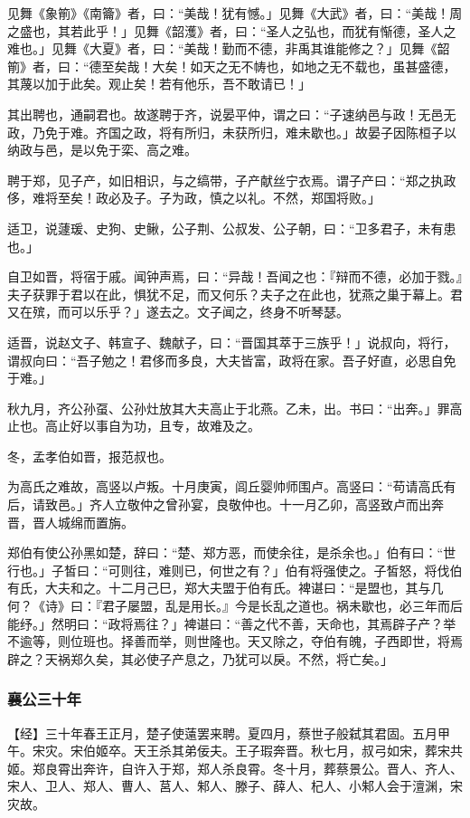 \documentclass[]{article}
\begin{document}
见舞《象箾》《南籥》者，曰：``美哉！犹有憾。」见舞《大武》者，曰：``美哉！周之盛也，其若此乎！」见舞《韶濩》者，曰：``圣人之弘也，而犹有惭德，圣人之难也。」见舞《大夏》者，曰：``美哉！勤而不德，非禹其谁能修之？」见舞《韶箾》者，曰：``德至矣哉！大矣！如天之无不帱也，如地之无不载也，虽甚盛德，其蔑以加于此矣。观止矣！若有他乐，吾不敢请已！」

其出聘也，通嗣君也。故遂聘于齐，说晏平仲，谓之曰：``子速纳邑与政！无邑无政，乃免于难。齐国之政，将有所归，未获所归，难未歇也。」故晏子因陈桓子以纳政与邑，是以免于栾、高之难。

聘于郑，见子产，如旧相识，与之缟带，子产献丝宁衣焉。谓子产曰：``郑之执政侈，难将至矣！政必及子。子为政，慎之以礼。不然，郑国将败。」

适卫，说蘧瑗、史狗、史鳅，公子荆、公叔发、公子朝，曰：``卫多君子，未有患也。」

自卫如晋，将宿于戚。闻钟声焉，曰：``异哉！吾闻之也：『辩而不德，必加于戮。』夫子获罪于君以在此，惧犹不足，而又何乐？夫子之在此也，犹燕之巢于幕上。君又在殡，而可以乐乎？」遂去之。文子闻之，终身不听琴瑟。

适晋，说赵文子、韩宣子、魏献子，曰：``晋国其萃于三族乎！」说叔向，将行，谓叔向曰：``吾子勉之！君侈而多良，大夫皆富，政将在家。吾子好直，必思自免于难。」

秋九月，齐公孙虿、公孙灶放其大夫高止于北燕。乙未，出。书曰：``出奔。」罪高止也。高止好以事自为功，且专，故难及之。

冬，孟孝伯如晋，报范叔也。

为高氏之难故，高竖以卢叛。十月庚寅，闾丘婴帅师围卢。高竖曰：``苟请高氏有后，请致邑。」齐人立敬仲之曾孙宴，良敬仲也。十一月乙卯，高竖致卢而出奔晋，晋人城绵而置旃。

郑伯有使公孙黑如楚，辞曰：``楚、郑方恶，而使余往，是杀余也。」伯有曰：``世行也。」子皙曰：``可则往，难则已，何世之有？」伯有将强使之。子皙怒，将伐伯有氏，大夫和之。十二月己巳，郑大夫盟于伯有氏。裨谌曰：``是盟也，其与几何？《诗》曰：『君子屡盟，乱是用长。』今是长乱之道也。祸未歇也，必三年而后能纾。」然明曰：``政将焉往？」裨谌曰：``善之代不善，天命也，其焉辟子产？举不逾等，则位班也。择善而举，则世隆也。天又除之，夺伯有魄，子西即世，将焉辟之？天祸郑久矣，其必使子产息之，乃犹可以戾。不然，将亡矣。」

\hypertarget{header-n2302}{%
\subsubsection{襄公三十年}\label{header-n2302}}

【经】三十年春王正月，楚子使薳罢来聘。夏四月，蔡世子般弑其君固。五月甲午。宋灾。宋伯姬卒。天王杀其弟佞夫。王子瑕奔晋。秋七月，叔弓如宋，葬宋共姬。郑良霄出奔许，自许入于郑，郑人杀良霄。冬十月，葬蔡景公。晋人、齐人、宋人、卫人、郑人、曹人、莒人、邾人、滕子、薛人、杞人、小邾人会于澶渊，宋灾故。
\end{document}
